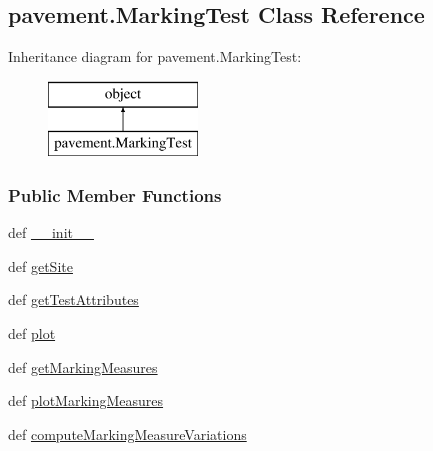 \hypertarget{classpavement_1_1MarkingTest}{\subsection{pavement.\-Marking\-Test Class Reference}
\label{classpavement_1_1MarkingTest}
}
Inheritance diagram for pavement.\-Marking\-Test\-:\begin{figure}[H]
\begin{center}
\leavevmode
\includegraphics[height=2.000000cm]{classpavement_1_1MarkingTest}
\end{center}
\end{figure}
\subsubsection*{Public Member Functions}
\begin{DoxyCompactItemize}
\item 
def \hyperlink{classpavement_1_1MarkingTest_af7c408fcf3d5acf2ccf8ba17a68a75fd}{\-\_\-\-\_\-init\-\_\-\-\_\-}
\item 
def \hyperlink{classpavement_1_1MarkingTest_a2be83971e50867810b73d987f349f8b4}{get\-Site}
\item 
def \hyperlink{classpavement_1_1MarkingTest_aef5ec08883921f794e9409fc630a45e7}{get\-Test\-Attributes}
\item 
def \hyperlink{classpavement_1_1MarkingTest_a67a6a94c0bae15e6578ec18fb0fe3718}{plot}
\item 
def \hyperlink{classpavement_1_1MarkingTest_acd1a2b8a42d620ce628edef3b9bb73d3}{get\-Marking\-Measures}
\item 
def \hyperlink{classpavement_1_1MarkingTest_a2c66d4cd8fd42e55858dbcfcaccae92d}{plot\-Marking\-Measures}
\item 
def \hyperlink{classpavement_1_1MarkingTest_a01019e00a695160ca874811217ef42e9}{compute\-Marking\-Measure\-Variations}
\end{DoxyCompactItemize}
